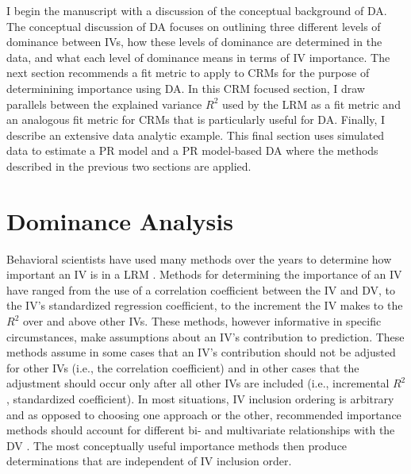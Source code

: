 \documentclass[man]{apa7}
\begin{document}
	I begin the manuscript with a discussion of the conceptual background of DA.
	The conceptual discussion of DA focuses on outlining three different levels of dominance between IVs, how these levels of dominance are determined in the data, and what each level of dominance means in terms of IV importance.
	The next section recommends a fit metric to apply to CRMs for the purpose of determinining importance using DA.
	In this CRM focused section, I draw parallels between the explained variance $R^2$ used by the LRM as a fit metric and an analogous fit metric for CRMs that is particularly useful for DA.
	Finally, I describe an extensive data analytic example.
	This final section uses simulated data to estimate a PR model and a PR model-based DA where the methods described in the previous two sections are applied.
		
\section{Dominance Analysis}

	Behavioral scientists have used many methods over the years to determine how important an IV is in a LRM \parencite[see reviews in][]{gromping2007estimators, johnson2004history}.
	Methods for determining the importance of an IV have ranged from the use of a correlation coefficient between the IV and DV, to the IV's standardized regression coefficient, to the increment the IV makes to the $R^2$ over and above other IVs.
	These methods, however informative in specific circumstances, make assumptions about an IV's contribution to prediction.
	These methods assume in some cases that an IV's contribution should not be adjusted for other IVs (i.e., the correlation coefficient) and in other cases that the adjustment should occur only after all other IVs are included (i.e., incremental $R^2$, standardized coefficient).
	In most situations, IV inclusion ordering is arbitrary and as opposed to choosing one approach or the other, recommended importance methods should account for different bi- and multivariate relationships with the DV \parencite{johnson2004history}.
	The most conceptually useful importance methods then produce determinations that are independent of IV inclusion order.
	
\end{document}
